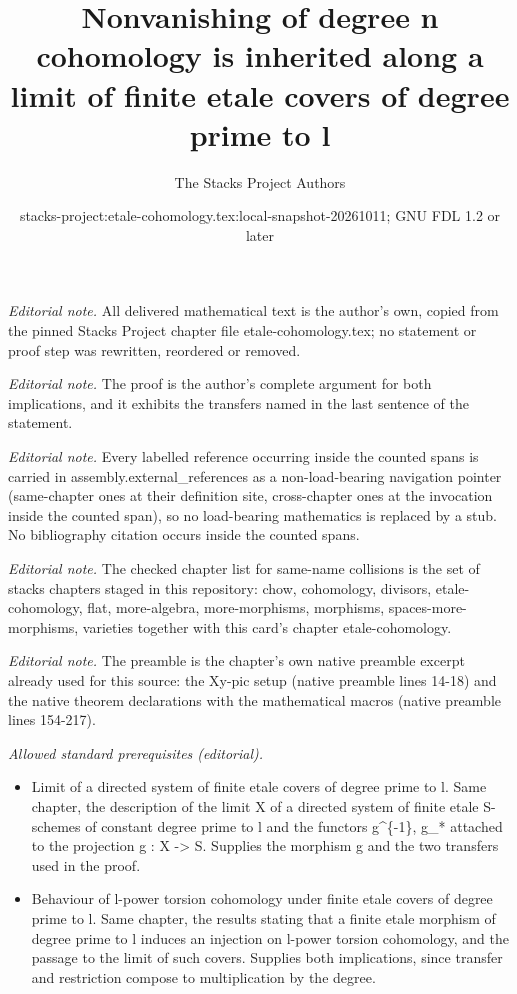 \documentclass[10pt,a4paper]{amsart}
\title{Nonvanishing of degree n cohomology is inherited along a limit of finite etale covers of degree prime to l}
\author{The Stacks Project Authors}
\date{stacks-project:etale-cohomology.tex:local-snapshot-20261011; GNU FDL 1.2 or later}
\theoremstyle{plain}
\theoremstyle{definition}
\theoremstyle{remark}
\numberwithin{equation}{subsection}
\begin{document}
\maketitle
\noindent\textit{Editorial note.} All delivered mathematical text is the author's own, copied from the pinned Stacks Project chapter file etale-cohomology.tex; no statement or proof step was rewritten, reordered or removed.\par\medskip
\noindent\textit{Editorial note.} The proof is the author's complete argument for both implications, and it exhibits the transfers named in the last sentence of the statement.\par\medskip
\noindent\textit{Editorial note.} Every labelled reference occurring inside the counted spans is carried in assembly.external\_references as a non-load-bearing navigation pointer (same-chapter ones at their definition site, cross-chapter ones at the invocation inside the counted span), so no load-bearing mathematics is replaced by a stub. No bibliography citation occurs inside the counted spans.\par\medskip
\noindent\textit{Editorial note.} The checked chapter list for same-name collisions is the set of stacks chapters staged in this repository: chow, cohomology, divisors, etale-cohomology, flat, more-algebra, more-morphisms, morphisms, spaces-more-morphisms, varieties together with this card's chapter etale-cohomology.\par\medskip
\noindent\textit{Editorial note.} The preamble is the chapter's own native preamble excerpt already used for this source: the Xy-pic setup (native preamble lines 14-18) and the native theorem declarations with the mathematical macros (native preamble lines 154-217).\par\medskip
\noindent\textit{Allowed standard prerequisites (editorial).}\begin{itemize}
\item Limit of a directed system of finite etale covers of degree prime to l. Same chapter, the description of the limit X of a directed system of finite etale S-schemes of constant degree prime to l and the functors g\textasciicircum{}\{-1\}, g\_* attached to the projection g : X -> S. Supplies the morphism g and the two transfers used in the proof.
\item Behaviour of l-power torsion cohomology under finite etale covers of degree prime to l. Same chapter, the results stating that a finite etale morphism of degree prime to l induces an injection on l-power torsion cohomology, and the passage to the limit of such covers. Supplies both implications, since transfer and restriction compose to multiplication by the degree.
\end{itemize}\medskip
\end{document}

